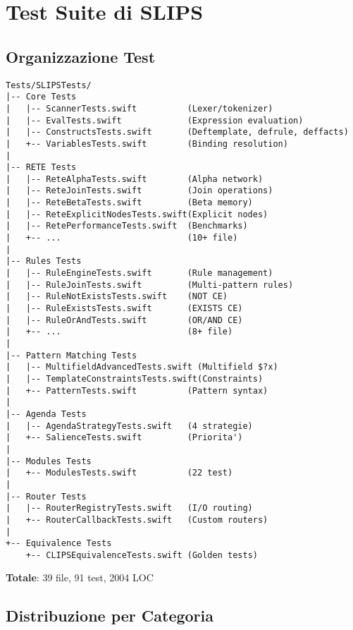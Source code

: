 \section{Test Suite di SLIPS}

\subsection{Organizzazione Test}

\begin{verbatim}
Tests/SLIPSTests/
|-- Core Tests
|   |-- ScannerTests.swift          (Lexer/tokenizer)
|   |-- EvalTests.swift             (Expression evaluation)
|   |-- ConstructsTests.swift       (Deftemplate, defrule, deffacts)
|   +-- VariablesTests.swift        (Binding resolution)
|
|-- RETE Tests
|   |-- ReteAlphaTests.swift        (Alpha network)
|   |-- ReteJoinTests.swift         (Join operations)
|   |-- ReteBetaTests.swift         (Beta memory)
|   |-- ReteExplicitNodesTests.swift(Explicit nodes)
|   |-- RetePerformanceTests.swift  (Benchmarks)
|   +-- ...                         (10+ file)
|
|-- Rules Tests
|   |-- RuleEngineTests.swift       (Rule management)
|   |-- RuleJoinTests.swift         (Multi-pattern rules)
|   |-- RuleNotExistsTests.swift    (NOT CE)
|   |-- RuleExistsTests.swift       (EXISTS CE)
|   |-- RuleOrAndTests.swift        (OR/AND CE)
|   +-- ...                         (8+ file)
|
|-- Pattern Matching Tests
|   |-- MultifieldAdvancedTests.swift (Multifield $?x)
|   |-- TemplateConstraintsTests.swift(Constraints)
|   +-- PatternTests.swift          (Pattern syntax)
|
|-- Agenda Tests
|   |-- AgendaStrategyTests.swift   (4 strategie)
|   +-- SalienceTests.swift         (Priorita')
|
|-- Modules Tests
|   +-- ModulesTests.swift          (22 test)
|
|-- Router Tests
|   |-- RouterRegistryTests.swift   (I/O routing)
|   +-- RouterCallbackTests.swift   (Custom routers)
|
+-- Equivalence Tests
    +-- CLIPSEquivalenceTests.swift (Golden tests)
\end{verbatim}

\textbf{Totale}: 39 file, 91 test, 2004 LOC

\subsection{Distribuzione per Categoria}

